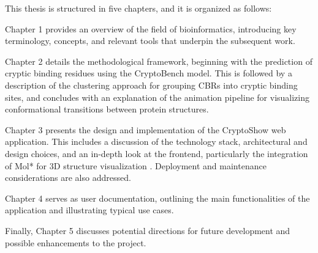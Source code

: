 This thesis is structured in five chapters, and it is organized as follows:

Chapter 1 provides an overview of the field of bioinformatics, introducing key terminology, concepts, and relevant tools that underpin the subsequent work.

Chapter 2 details the methodological framework, beginning with the prediction of cryptic binding residues using the CryptoBench model. This is followed by a description of the clustering approach for grouping CBRs into cryptic binding sites, and concludes with an explanation of the animation pipeline for visualizing conformational transitions between protein structures.

Chapter 3 presents the design and implementation of the CryptoShow web application. This includes a discussion of the technology stack, architectural and design choices, and an in-depth look at the frontend, particularly the integration of Mol* for 3D structure visualization \cite{sehnal2021mol}. Deployment and maintenance considerations are also addressed.

Chapter 4 serves as user documentation, outlining the main functionalities of the application and illustrating typical use cases.

Finally, Chapter 5 discusses potential directions for future development and possible enhancements to the project.
